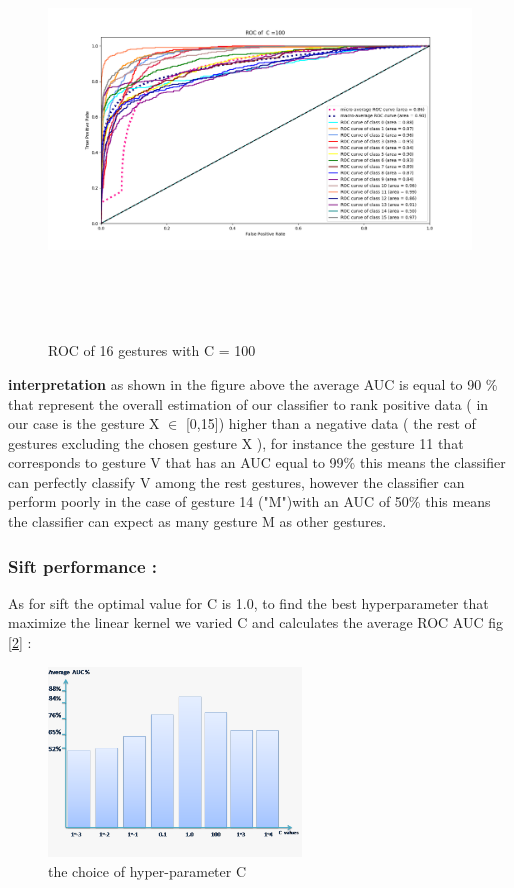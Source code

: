\begin{figure}[H]
\centering
\includegraphics[width=16.5cm, height=11cm]{img/roc/LINEAR_svm_onevsal_ROC_class_C100.png}
\caption{ROC of 16 gestures with  C = 100}
\label{fig:roc}
\end{figure}

\textbf{interpretation }
as shown in the figure above the average AUC is equal to 90 \%
that represent the  overall estimation of our classifier to rank positive data ( in our case is the gesture X $\in$ [0,15]) higher than a negative data ( the rest of gestures excluding the chosen gesture X ),  for instance the gesture 11 that corresponds to gesture V  that has an AUC equal to 99\% this means the classifier can perfectly classify V  among the rest gestures, however the classifier can perform poorly in the case of gesture 14 ("M")with an AUC of  50\%  this means the classifier can  expect  as many gesture M  as other gestures. 

\subsubsection{Sift performance : }
As for sift the optimal value for C is  1.0, to find the best hyperparameter that maximize the linear kernel we varied C and calculates the average ROC AUC fig [\ref{fig:Csift}] :

\begin{figure}[H]
\centering
\includegraphics[width=0.6\textwidth]{img/roc/sift_C_values.png}
\caption{the choice of hyper-parameter C }
\label{fig:Csift}
\end{figure}

